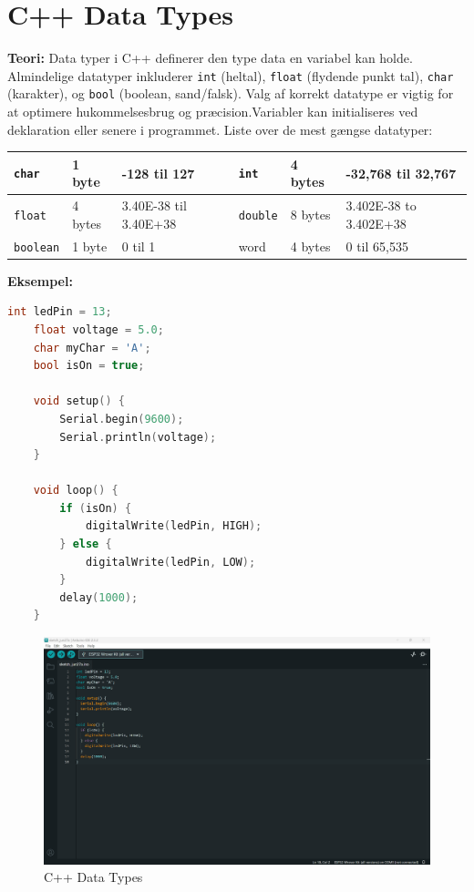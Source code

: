 \section{C++ Data Types}
\textbf{Teori:} Data typer i C++ definerer den type data en variabel kan holde. Almindelige datatyper inkluderer \texttt{int} (heltal), \texttt{float} (flydende punkt tal), \texttt{char} (karakter), og \texttt{bool} (boolean, sand/falsk). Valg af korrekt datatype er vigtig for at optimere hukommelsesbrug og præcision.Variabler kan initialiseres ved deklaration eller senere i programmet. Liste over de mest gængse datatyper:
\begin{table}[h!]
	\centering
	\tiny
	\begin{tabular}{|l|l|l|l|l|l|}
		\hline
		\texttt{char}&1 byte& -128 til 127&\texttt{int}&4 bytes&-32,768 til 32,767\\\hline
		\texttt{float}&4 bytes&3.40E-38 til 3.40E+38&\texttt{double}&8 bytes&3.402E-38 to 3.402E+38\\\hline
		\texttt{boolean}& 1 byte& 0 til 1& word &4 bytes& 0 til 65,535\\\hline
	\end{tabular}
\end{table}
\clearpage
\noindent\textbf{Eksempel:}
\begin{lstlisting}[language=C++]
	int ledPin = 13;
	float voltage = 5.0;
	char myChar = 'A';
	bool isOn = true;
	
	void setup() {
		Serial.begin(9600);
		Serial.println(voltage);
	}
	
	void loop() {
		if (isOn) {
			digitalWrite(ledPin, HIGH);
		} else {
			digitalWrite(ledPin, LOW);
		}
		delay(1000);
	}
\end{lstlisting}

\begin{figure}[!h]
	\centering
	\includegraphics[width=\textwidth]{fig/fig5.png}
	\caption{C++ Data Types}
	\label{fig:5}
\end{figure}

